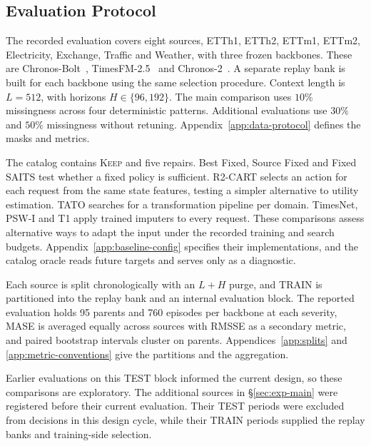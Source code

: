 \documentclass{article}
\begin{document}
\subsection{Evaluation Protocol}
\label{sec:exp-setup}
The recorded evaluation covers eight sources, ETTh1, ETTh2, ETTm1, ETTm2, Electricity,
Exchange, Traffic and Weather, with three frozen backbones. These are
Chronos-Bolt~\citep{chronosbolt2025}, TimesFM-2.5~\citep{das2024timesfm} and
Chronos-2~\citep{chronos2_2025}. A separate replay bank is built for each backbone using the
same selection procedure. Context length is $L=512$, with horizons $H \in \{96,192\}$.
The main comparison uses $10\%$ missingness across four deterministic patterns.
Additional evaluations use $30\%$ and $50\%$ missingness without retuning.
Appendix~\ref{app:data-protocol} defines the masks and metrics.

The catalog contains \textsc{Keep} and five repairs. Best Fixed, Source Fixed and Fixed SAITS
test whether a fixed policy is sufficient. R2-CART selects an action for each request from
the same state features, testing a simpler alternative to utility estimation. TATO searches
for a transformation pipeline per domain. TimesNet, PSW-I and T1 apply trained imputers to
every request. These comparisons assess alternative ways to adapt the input under the
recorded training and search budgets.
Appendix~\ref{app:baseline-config} specifies their implementations, and the catalog oracle
reads future targets and serves only as a diagnostic.

Each source is split chronologically with an $L+H$ purge, and TRAIN is partitioned into the
replay bank and an internal evaluation block. The reported evaluation holds 95 parents and 760
episodes per backbone at each severity, MASE is averaged equally across sources with RMSSE as
a secondary metric, and paired bootstrap intervals cluster on parents.
Appendices~\ref{app:splits} and \ref{app:metric-conventions} give the partitions and the
aggregation.

Earlier evaluations on this TEST block informed the current design, so these comparisons
are exploratory. The additional sources in \S\ref{sec:exp-main} were registered before their
current evaluation. Their TEST periods were excluded from decisions in this design cycle,
while their TRAIN periods supplied the replay banks and training-side selection.
\end{document}
